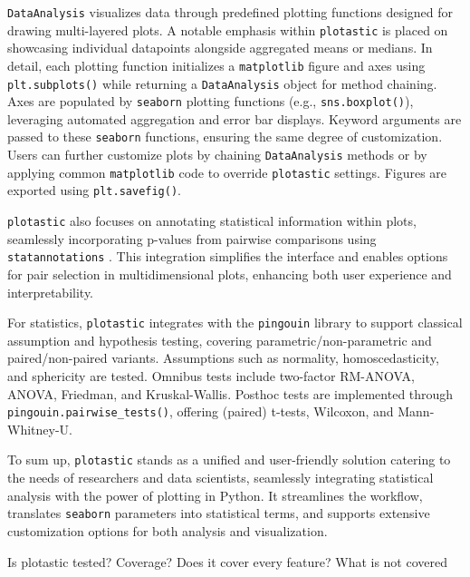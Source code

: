 \texttt{DataAnalysis} visualizes data through predefined plotting functions
designed for drawing multi-layered plots. A notable emphasis within
\texttt{plotastic} is placed on showcasing individual datapoints alongside
aggregated means or medians. In detail, each plotting function
initializes a \texttt{matplotlib} figure and axes using \texttt{plt.subplots()} while
returning a \texttt{DataAnalysis} object for method chaining. Axes are
populated by \texttt{seaborn} plotting functions (e.g., \texttt{sns.boxplot()}),
leveraging automated aggregation and error bar displays. Keyword
arguments are passed to these \texttt{seaborn} functions, ensuring the same
degree of customization. Users can further customize plots
by chaining \texttt{DataAnalysis} methods or by applying common \texttt{matplotlib} code
to override \texttt{plotastic} settings. Figures are exported using
\texttt{plt.savefig()}.

\texttt{plotastic} also focuses on annotating statistical information within
plots, seamlessly incorporating p-values from pairwise comparisons using
\texttt{statannotations} \cite{charlierTrevismdStatannotationsV02022}. This
integration simplifies the interface and enables options for pair
selection in multidimensional plots, enhancing both user experience and
interpretability.

For statistics, \texttt{plotastic} integrates with the \texttt{pingouin} library
to support classical assumption and hypothesis testing, covering
parametric/non-parametric and paired/non-paired variants. Assumptions such as
normality, homoscedasticity, and sphericity are tested. Omnibus tests include
two-factor RM-ANOVA, ANOVA, Friedman, and Kruskal-Wallis. Posthoc tests are
implemented through \texttt{pingouin.pairwise\_tests()}, offering (paired)
t-tests, Wilcoxon, and Mann-Whitney-U.

To sum up, \texttt{plotastic} stands as a unified and user-friendly solution
catering to the needs of researchers and data scientists, seamlessly
integrating statistical analysis with the power of plotting in Python.
It streamlines the workflow, translates \texttt{seaborn} parameters into
statistical terms, and supports extensive customization options for both
analysis and visualization.

\newpage




%
\label{sec:C2_discussion}%
Is plotastic tested? Coverage? Does it cover every feature? What is not covered

